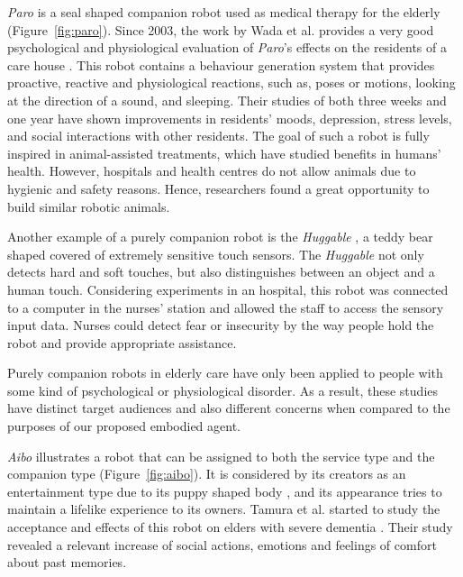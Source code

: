 \emph{Paro} is a seal shaped companion robot used as medical therapy for the elderly (Figure~\ref{fig:paro}).
Since 2003, the work by Wada et al. provides a very good psychological and physiological evaluation of \emph{Paro}'s effects on the residents of a care house \cite{Wada2007,Wada2005,Wada2003}.
This robot contains a behaviour generation system that provides proactive, reactive and physiological reactions, such as, poses or motions, looking at the direction of a sound, and sleeping.
Their studies of both three weeks and one year have shown improvements in residents' moods, depression, stress levels, and social interactions with other residents.
The goal of such a robot is fully inspired in animal-assisted treatments, which have studied benefits in humans' health.
However, hospitals and health centres do not allow animals due to hygienic and safety reasons.
Hence, researchers found a great opportunity to build similar robotic animals.

Another example of a purely companion robot is the \emph{Huggable} \cite{Stiehl2005}, a teddy bear shaped covered of extremely sensitive touch sensors.
The \emph{Huggable} not only detects hard and soft touches, but also distinguishes between an object and a human touch.
Considering experiments in an hospital, this robot was connected to a computer in the nurses' station and allowed the staff to access the sensory input data.
Nurses could detect fear or insecurity by the way people hold the robot and provide appropriate assistance.

Purely companion robots in elderly care have only been applied to people with some kind of psychological or physiological disorder.
As a result, these studies have distinct target audiences and also different concerns when compared to the purposes of our proposed embodied agent.


\emph{Aibo} illustrates a robot that can be assigned to both the service type and the companion type (Figure~\ref{fig:aibo}).
It is considered by its creators as an entertainment type due to its puppy shaped body \cite{Fujita1983}, and its appearance tries to maintain a lifelike experience to its owners.
Tamura et al. started to study the acceptance and effects of this robot on elders with severe dementia \cite{Tamura2004}.
Their study revealed a relevant increase of social actions, emotions and feelings of comfort about past memories.



